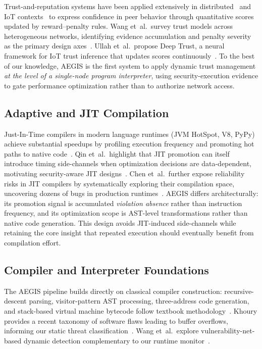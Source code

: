 \documentclass[conference]{IEEEtran}
\begin{document}
Trust-and-reputation systems have been applied extensively in
distributed~\cite{wang2022trust} and IoT
contexts~\cite{li2022iot_trust,fernandez2024sla,ullah2024deeptrust}
to express confidence in peer behavior through quantitative scores
updated by reward--penalty rules. Wang et~al.\ survey trust models
across heterogeneous networks, identifying evidence accumulation and
penalty severity as the primary design axes~\cite{wang2022trust}.
Ullah et~al.\ propose Deep Trust, a neural framework for IoT trust
inference that updates scores continuously~\cite{ullah2024deeptrust}.
To the best of our knowledge, AEGIS is the first system to apply
dynamic trust management \emph{at the level of a single-node
program interpreter}, using security-execution evidence to gate
performance optimization rather than to authorize network access.

\subsection{Adaptive and JIT Compilation}

Just-In-Time compilers in modern language runtimes (JVM HotSpot,
V8, PyPy) achieve substantial speedups by profiling execution
frequency and promoting hot paths to native
code~\cite{qin2022jit_security}. Qin et~al.\ highlight that JIT
promotion can itself introduce timing side-channels when optimization
decisions are data-dependent, motivating security-aware JIT
designs~\cite{qin2022jit_security}. Chen et~al.\ further expose
reliability risks in JIT compilers by systematically exploring
their compilation space, uncovering dozens of bugs in production
runtimes~\cite{chen2024jit_val}. AEGIS differs architecturally:
its promotion signal is accumulated \emph{violation absence} rather
than instruction frequency, and its optimization scope is
AST-level transformations rather than native code generation.
This design avoids JIT-induced side-channels while retaining the
core insight that repeated execution should eventually benefit from
compilation effort.

\subsection{Compiler and Interpreter Foundations}

The AEGIS pipeline builds directly on classical compiler
construction: recursive-descent parsing, visitor-pattern AST
processing, three-address code generation, and stack-based virtual
machine bytecode follow textbook
methodology~\cite{aho2007compilers}. Khoury provides a recent
taxonomy of software flaws leading to buffer overflows, informing
our static threat classification~\cite{khoury2022buffer}. Wang
et~al.\ explore vulnerability-net-based dynamic detection
complementary to our runtime monitor~\cite{wang2022vulnets}.
\end{document}
